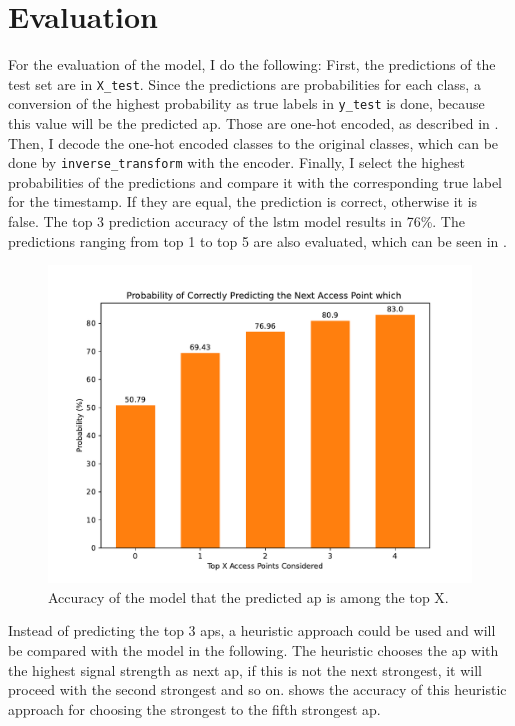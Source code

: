 \chapter{Evaluation}\label{ch:evaluation}

For the evaluation of the model, I do the following:
First, the predictions of the test set are in \texttt{X\_test}.
Since the predictions are probabilities for each class, a conversion of the highest probability as true labels in \texttt{y\_test} is done, because this value will be the predicted \ac{ap}.
Those are one-hot encoded, as described in .
Then, I decode the one-hot encoded classes to the original classes, which can be done by \texttt{inverse\_transform} with the encoder.
Finally, I select the highest probabilities of the predictions and compare it with the corresponding true label for the timestamp.
If they are equal, the prediction is correct, otherwise it is false.
The top 3 prediction accuracy of the \ac{lstm} model results in 76\%.
The predictions ranging from top 1 to top 5 are also evaluated, which can be seen in .

\begin{figure}[h]
    \includegraphics*[scale=0.6]{images/ml_plot.pdf}
    \caption{Accuracy of the model that the predicted \ac{ap} is among the top X.}
    \label{fig:ml_plot}
\end{figure}

Instead of predicting the top 3 \acp{ap}, a heuristic approach could be used and will be compared with the model in the following.
The heuristic chooses the \ac{ap} with the highest signal strength as next \ac{ap}, if this is not the next strongest, it will proceed with the second strongest and so on.
 shows the accuracy of this heuristic approach for choosing the strongest to the fifth strongest \ac{ap}.

